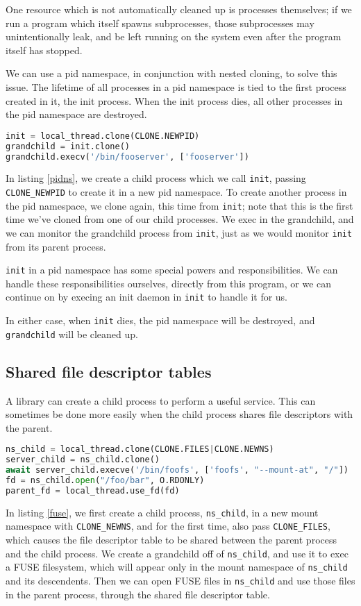 \documentclass{acmart}
\begin{document}
One resource which is not automatically cleaned up is processes themselves;
if we run a program which itself spawns subprocesses,
those subprocesses may unintentionally leak,
and be left running on the system even after the program itself has stopped.

We can use a pid namespace, in conjunction with nested cloning, to solve this issue.
The lifetime of all processes in a pid namespace is tied to the first process created in it,
the init process.
When the init process dies,
all other processes in the pid namespace are destroyed.

\begin{lstlisting}[float,language=Python,label={pidns},caption={Nested clone and pid namespace}]
init = local_thread.clone(CLONE.NEWPID)
grandchild = init.clone()
grandchild.execv('/bin/fooserver', ['fooserver'])
\end{lstlisting}

In listing \ref{pidns},
we create a child process which we call \texttt{init},
passing \verb|CLONE_NEWPID| to create it in a new pid namespace.
To create another process in the pid namespace,
we clone again, this time from \texttt{init};
note that this is the first time we've cloned from one of our child processes.
We exec in the grandchild,
and we can monitor the grandchild process from \texttt{init},
just as we would monitor \texttt{init} from its parent process.

\texttt{init} in a pid namespace has some special powers and responsibilities.
We can handle these responsibilities ourselves, directly from this program,
or we can continue on by execing an init daemon in \texttt{init} to handle it for us.

In either case, when \texttt{init} dies,
the pid namespace will be destroyed,
and \texttt{grandchild} will be cleaned up.

\subsection{Shared file descriptor tables}
A library can create a child process to perform a useful service.
This can sometimes be done more easily when the child process shares file descriptors with the parent.
\begin{lstlisting}[float,language=Python,label={fuse},caption={Shared file descriptor tables}]
ns_child = local_thread.clone(CLONE.FILES|CLONE.NEWNS)
server_child = ns_child.clone()
await server_child.execve('/bin/foofs', ['foofs', "--mount-at", "/"])
fd = ns_child.open("/foo/bar", O.RDONLY)
parent_fd = local_thread.use_fd(fd)
\end{lstlisting}
In listing \ref{fuse},
we first create a child process, \verb|ns_child|, in a new mount namespace with \verb|CLONE_NEWNS|,
and for the first time, also pass \verb|CLONE_FILES|,
which causes the file descriptor table to be shared between the parent process and the child process.
We create a grandchild off of \verb|ns_child|,
and use it to exec a FUSE filesystem,
which will appear only in the mount namespace of \verb|ns_child| and its descendents.
Then we can open FUSE files in \verb|ns_child|
and use those files in the parent process,
through the shared file descriptor table.
\end{document}
